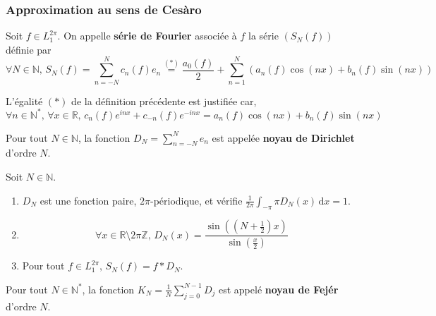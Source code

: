   \subsubsection{Approximation au sens de Cesàro}


  \begin{definition}
    Soit $f \in L_1^{2\pi}$. On appelle \textbf{série de Fourier} associée à $f$ la série $(S_N(f))$ définie par
    \[ \forall N \in \mathbb{N}, \, S_N(f) = \sum_{n=-N}^{N} c_n(f) e_n \overset{(*)}{=} \frac{a_0(f)}{2} + \sum_{n = 1}^N (a_n(f) \cos(nx) + b_n(f) \sin(nx)) \]
  \end{definition}

  \begin{remark}
    L'égalité $(*)$ de la définition précédente est justifiée car,
    \[ \forall n \in \mathbb{N}^*, \, \forall x \in \mathbb{R}, \, c_n(f) e^{inx} + c_{-n}(f) e^{-inx} = a_n(f) \cos(nx) + b_n(f) \sin(nx) \]
  \end{remark}


  \begin{definition}
    Pour tout $N \in \mathbb{N}$, la fonction $D_N = \sum_{n=-N}^{N} e_n$ est appelée \textbf{noyau de Dirichlet} d'ordre $N$.
  \end{definition}

  \begin{proposition}
    Soit $N \in \mathbb{N}$.
    \begin{enumerate}[label={\bfseries(\roman*)}]
      \item $D_N$ est une fonction paire, $2\pi$-périodique, et vérifie $\frac{1}{2\pi} \int_{-\pi}{\pi} D_N(x) \, \mathrm{d}x = 1$.
      \item \[ \forall x \in \mathbb{R} \setminus 2 \pi \mathbb{Z}, \, D_N(x) = \frac{\sin \left(\left( N + \frac{1}{2} \right) x \right)}{\sin \left( \frac{x}{2} \right)} \]
      \item Pour tout $f \in L_1^{2 \pi}, \, S_N(f) = f * D_N$.
    \end{enumerate}
  \end{proposition}

  \begin{definition}
    Pour tout $N \in \mathbb{N}^*$, la fonction $K_N = \frac{1}{N} \sum_{j=0}^{N-1} D_j$ est appelé \textbf{noyau de Fejér} d'ordre $N$.
  \end{definition}

